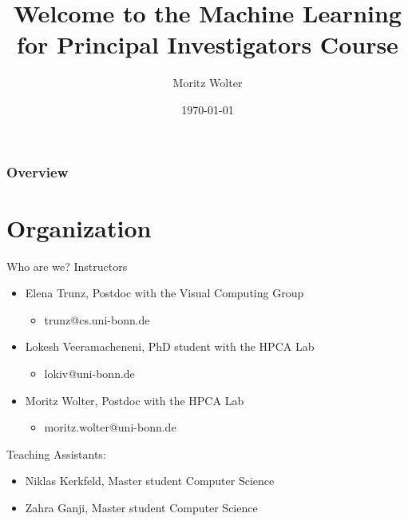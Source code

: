 \documentclass{beamer}
\title{Welcome to the Machine Learning for Principal Investigators Course}
\date{\today}
\institute{High-Performance Computing and Analytics Lab, Universität Bonn}
\author{Moritz Wolter}
\begin{document}
    \maketitle

    \begin{frame}
    \frametitle{Overview} 
    \tableofcontents
    \end{frame}

    \section{Organization}
    \begin{frame}{Who are we?}
      Instructors
      \begin{itemize}
        \item Elena Trunz, Postdoc with the Visual Computing Group
        \begin{itemize}
          \item trunz@cs.uni-bonn.de
        \end{itemize}
        \item Lokesh Veeramacheneni, PhD student with the HPCA Lab
        \begin{itemize}
          \item lokiv@uni-bonn.de
        \end{itemize}
        \item Moritz Wolter, Postdoc with the HPCA Lab
        \begin{itemize}
          \item moritz.wolter@uni-bonn.de
        \end{itemize}
      \end{itemize}
      Teaching Assistants:
      \begin{itemize}
        \item Niklas Kerkfeld, Master student Computer Science
        \item Zahra Ganji, Master student Computer Science
      \end{itemize}
    \end{frame}
\end{document}
